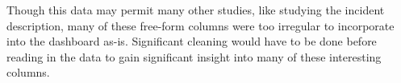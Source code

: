 \documentclass[a4paper,11pt]{article}
\begin{document}
Though this data may permit many other studies, like studying the incident description, many of these free-form columns were too irregular to incorporate into the dashboard as-is.  Significant cleaning would have to be done before reading in the data to gain significant insight into many of these interesting columns.

\end{document}
